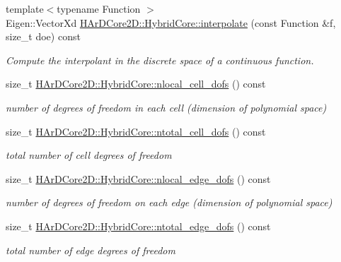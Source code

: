 \begin{DoxyCompactItemize}
{\footnotesize template$<$typename Function $>$ }\\Eigen\+::\+Vector\+Xd \hyperlink{group__HybridCore_ga71c953efc96f467cb24faa1b60ee9bb2}{H\+Ar\+D\+Core2\+D\+::\+Hybrid\+Core\+::interpolate} (const Function \&f, size\+\_\+t doe) const
\begin{DoxyCompactList}\small\item\em Compute the interpolant in the discrete space of a continuous function. \end{DoxyCompactList}\item 
\mbox{\label{group__HybridCore_gab698480a3a9e9339d5c191549b817501}} 
size\+\_\+t \hyperlink{group__HybridCore_gab698480a3a9e9339d5c191549b817501}{H\+Ar\+D\+Core2\+D\+::\+Hybrid\+Core\+::nlocal\+\_\+cell\+\_\+dofs} () const
\begin{DoxyCompactList}\small\item\em number of degrees of freedom in each cell (dimension of polynomial space) \end{DoxyCompactList}\item 
\mbox{\label{group__HybridCore_ga86e6a3566cf506821606c8802a5f2364}} 
size\+\_\+t \hyperlink{group__HybridCore_ga86e6a3566cf506821606c8802a5f2364}{H\+Ar\+D\+Core2\+D\+::\+Hybrid\+Core\+::ntotal\+\_\+cell\+\_\+dofs} () const
\begin{DoxyCompactList}\small\item\em total number of cell degrees of freedom \end{DoxyCompactList}\item 
\mbox{\label{group__HybridCore_ga41f1294e34e4daade19ad16981eaac15}} 
size\+\_\+t \hyperlink{group__HybridCore_ga41f1294e34e4daade19ad16981eaac15}{H\+Ar\+D\+Core2\+D\+::\+Hybrid\+Core\+::nlocal\+\_\+edge\+\_\+dofs} () const
\begin{DoxyCompactList}\small\item\em number of degrees of freedom on each edge (dimension of polynomial space) \end{DoxyCompactList}\item 
\mbox{\label{group__HybridCore_gac0af0b8fa9bea07b9cfba8cbb1b50bed}} 
size\+\_\+t \hyperlink{group__HybridCore_gac0af0b8fa9bea07b9cfba8cbb1b50bed}{H\+Ar\+D\+Core2\+D\+::\+Hybrid\+Core\+::ntotal\+\_\+edge\+\_\+dofs} () const
\begin{DoxyCompactList}\small\item\em total number of edge degrees of freedom \end{DoxyCompactList}\item 

\end{DoxyCompactItemize}
